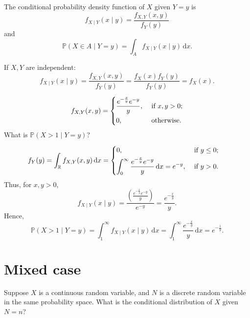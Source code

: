 \begin{definition}
    The conditional probability density function of \(X\) given \(Y = y\) is 
    \[
        f_{X \mid Y}(x \mid y) = \frac{f_{X, Y}(x, y)}{f_Y(y)}
    \]  and 
    \[
        \mathbb{P} (X \in A \mid Y = y) = \int _A f_{X \mid Y}(x \mid y) \, \mathrm{d} x. 
    \]
\end{definition}

\begin{remark}
    If \(X, Y\) are independent: 
    \[
        f_{X \mid Y}(x \mid y) = \frac{f_{X, Y}(x, y)}{f_Y(y)} = \frac{f_X(x) f_Y(y)}{f_Y(y)} = f_X(x).
    \] 
\end{remark}

\begin{eg}
    \[
        f_{X, Y}(x, y) = \begin{dcases}
            \frac{e^{- \frac{x}{y}} e^{-y}}{y}, &\text{ if } x, y > 0 ;\\
            0, &\text{ otherwise}.
        \end{dcases}
    \]
    What is \(\mathbb{P} (X > 1 \mid Y = y)\)? 
\end{eg}

\begin{explanation}
    \begin{align*}
        f_Y(y) &= \int _\mathbb{R} f_{X, Y}(x, y) \, \mathrm{d} x = \begin{dcases}
            0, &\text{ if } y \le 0 ;\\
            \int _0^{\infty} \frac{e^{- \frac{x}{y}} e^{-y}}{y} \, \mathrm{d} x = e^{-y}, &\text{ if }y > 0.
        \end{dcases} 
    \end{align*}
    Thus, for \(x, y > 0\),
    \[
        f_{X \mid Y} (x \mid y) = \frac{ \left( \frac{e^{- \frac{x}{y}} e^{-y}}{y} \right) }{e^{-y}} = \frac{e^{- \frac{x}{y}}}{y}.
    \] 
    Hence, 
    \[
        \mathbb{P} (X > 1 \mid Y = y) = \int _1^{\infty} f_{X \mid Y} (x \mid y) \, \mathrm{d} x = \int _1^{\infty} \frac{e^{- \frac{x}{y}}}{y} \, \mathrm{d} x = e^{- \frac{1}{y}}.  
    \]
\end{explanation}

\section{Mixed case}
Suppose \(X\) is a continuous random variable, and \(N\) is a discrete random variable in the same probability space. What is the conditional distribution of \(X\) given \(N = n\)? 

